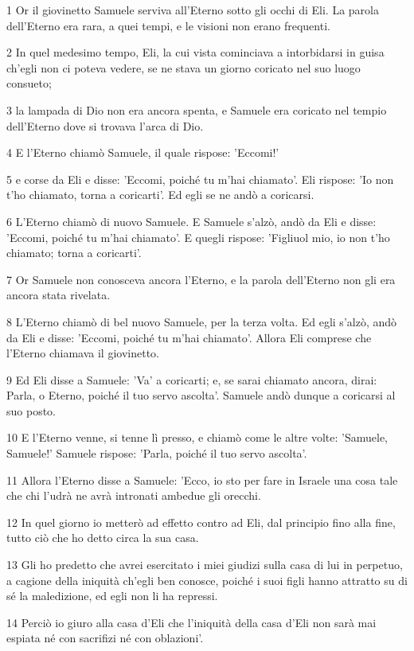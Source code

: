 \par 1 Or il giovinetto Samuele serviva all'Eterno sotto gli occhi di Eli. La parola dell'Eterno era rara, a quei tempi, e le visioni non erano frequenti.
\par 2 In quel medesimo tempo, Eli, la cui vista cominciava a intorbidarsi in guisa ch'egli non ci poteva vedere, se ne stava un giorno coricato nel suo luogo consueto;
\par 3 la lampada di Dio non era ancora spenta, e Samuele era coricato nel tempio dell'Eterno dove si trovava l'arca di Dio.
\par 4 E l'Eterno chiamò Samuele, il quale rispose: 'Eccomi!'
\par 5 e corse da Eli e disse: 'Eccomi, poiché tu m'hai chiamato'. Eli rispose: 'Io non t'ho chiamato, torna a coricarti'. Ed egli se ne andò a coricarsi.
\par 6 L'Eterno chiamò di nuovo Samuele. E Samuele s'alzò, andò da Eli e disse: 'Eccomi, poiché tu m'hai chiamato'. E quegli rispose: 'Figliuol mio, io non t'ho chiamato; torna a coricarti'.
\par 7 Or Samuele non conosceva ancora l'Eterno, e la parola dell'Eterno non gli era ancora stata rivelata.
\par 8 L'Eterno chiamò di bel nuovo Samuele, per la terza volta. Ed egli s'alzò, andò da Eli e disse: 'Eccomi, poiché tu m'hai chiamato'. Allora Eli comprese che l'Eterno chiamava il giovinetto.
\par 9 Ed Eli disse a Samuele: 'Va' a coricarti; e, se sarai chiamato ancora, dirai: Parla, o Eterno, poiché il tuo servo ascolta'. Samuele andò dunque a coricarsi al suo posto.
\par 10 E l'Eterno venne, si tenne lì presso, e chiamò come le altre volte: 'Samuele, Samuele!' Samuele rispose: 'Parla, poiché il tuo servo ascolta'.
\par 11 Allora l'Eterno disse a Samuele: 'Ecco, io sto per fare in Israele una cosa tale che chi l'udrà ne avrà intronati ambedue gli orecchi.
\par 12 In quel giorno io metterò ad effetto contro ad Eli, dal principio fino alla fine, tutto ciò che ho detto circa la sua casa.
\par 13 Gli ho predetto che avrei esercitato i miei giudizi sulla casa di lui in perpetuo, a cagione della iniquità ch'egli ben conosce, poiché i suoi figli hanno attratto su di sé la maledizione, ed egli non li ha repressi.
\par 14 Perciò io giuro alla casa d'Eli che l'iniquità della casa d'Eli non sarà mai espiata né con sacrifizi né con oblazioni'.
